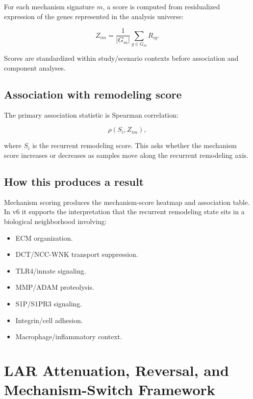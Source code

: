 \documentclass[11pt]{article}
\begin{document}
For each mechanism signature $m$, a score is computed from residualized expression of the genes represented in the analysis universe:

\begin{equation}
Z_{im}=\frac{1}{|G_m|}\sum_{g\in G_m}R_{ig}.
\end{equation}

Scores are standardized within study/scenario contexts before association and component analyses.

\subsection{Association with remodeling score}

The primary association statistic is Spearman correlation:

\begin{equation}
\rho(S_i,Z_{im}),
\end{equation}

where $S_i$ is the recurrent remodeling score. This asks whether the mechanism score increases or decreases as samples move along the recurrent remodeling axis.

\subsection{How this produces a result}

Mechanism scoring produces the mechanism-score heatmap and association table. In v6 it supports the interpretation that the recurrent remodeling state sits in a biological neighborhood involving:

\begin{itemize}
  \item ECM organization.
  \item DCT/NCC-WNK transport suppression.
  \item TLR4/innate signaling.
  \item MMP/ADAM proteolysis.
  \item S1P/S1PR3 signaling.
  \item Integrin/cell adhesion.
  \item Macrophage/inflammatory context.
\end{itemize}

\section{LAR Attenuation, Reversal, and Mechanism-Switch Framework}
\end{document}
